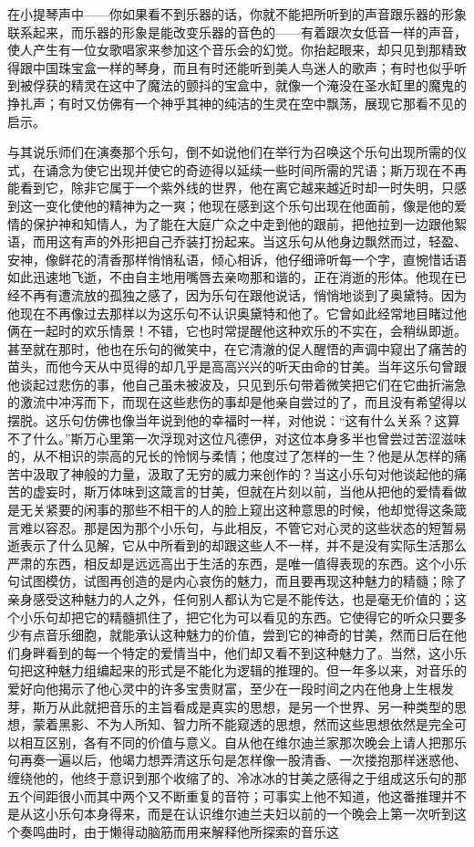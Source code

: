 \par 在小提琴声中——你如果看不到乐器的话，你就不能把所听到的声音跟乐器的形象联系起来，而乐器的形象是能改变乐器的音色的——有着跟次女低音一样的声音，使人产生有一位女歌唱家来参加这个音乐会的幻觉。你抬起眼来，却只见到那精致得跟中国珠宝盒一样的琴身，而且有时还能听到美人鸟迷人的歌声；有时也似乎听到被俘获的精灵在这中了魔法的颤抖的宝盒中，就像一个淹没在圣水缸里的魔鬼的挣扎声；有时又仿佛有一个神乎其神的纯洁的生灵在空中飘荡，展现它那看不见的启示。
\par 与其说乐师们在演奏那个乐句，倒不如说他们在举行为召唤这个乐句出现所需的仪式，在诵念为使它出现并使它的奇迹得以延续一些时间所需的咒语；斯万现在不再能看到它，除非它属于一个紫外线的世界，他在离它越来越近时却一时失明，只感到这一变化使他的精神为之一爽；他现在感到这个乐句出现在他面前，像是他的爱情的保护神和知情人，为了能在大庭广众之中走到他的跟前，把他拉到一边跟他絮语，而用这有声的外形把自己乔装打扮起来。当这乐句从他身边飘然而过，轻盈、安神，像鲜花的清香那样悄悄私语，倾心相诉，他仔细谛听每一个字，直惋惜话语如此迅速地飞逝，不由自主地用嘴唇去亲吻那和谐的，正在消逝的形体。他现在已经不再有遭流放的孤独之感了，因为乐句在跟他说话，悄悄地谈到了奥黛特。因为他现在不再像过去那样以为这乐句不认识奥黛特和他了。它曾如此经常地目睹过他俩在一起时的欢乐情景！不错，它也时常提醒他这种欢乐的不实在，会稍纵即逝。甚至就在那时，他也在乐句的微笑中，在它清澈的促人醒悟的声调中窥出了痛苦的苗头，而他今天从中觅得的却几乎是高高兴兴的听天由命的甘美。当年这乐句曾跟他谈起过悲伤的事，他自己虽未被波及，只见到乐句带着微笑把它们在它曲折湍急的激流中冲泻而下，而现在这些悲伤的事却是他亲自尝过的了，而且没有希望得以摆脱。这乐句仿佛也像当年说到他的幸福时一样，对他说：“这有什么关系？这算不了什么。”斯万心里第一次浮现对这位凡德伊，对这位本身多半也曾尝过苦涩滋味的，从不相识的崇高的兄长的怜悯与柔情；他度过了怎样的一生？他是从怎样的痛苦中汲取了神般的力量，汲取了无穷的威力来创作的？当这小乐句对他谈起他的痛苦的虚妄时，斯万体味到这箴言的甘美，但就在片刻以前，当他从把他的爱情看做是无关紧要的闲事的那些不相干的人的脸上窥出这种意思的时候，他却觉得这条箴言难以容忍。那是因为那个小乐句，与此相反，不管它对心灵的这些状态的短暂易逝表示了什么见解，它从中所看到的却跟这些人不一样，并不是没有实际生活那么严肃的东西，相反却是远远高出于生活的东西，是唯一值得表现的东西。这个小乐句试图模仿，试图再创造的是内心哀伤的魅力，而且要再现这种魅力的精髓；除了亲身感受这种魅力的人之外，任何别人都认为它是不能传达，也是毫无价值的；这个小乐句却把它的精髓抓住了，把它化为可以看见的东西。它使得它的听众只要多少有点音乐细胞，就能承认这种魅力的价值，尝到它的神奇的甘美，然而日后在他们身畔看到的每一个特定的爱情当中，他们却又看不到这种魅力了。当然，这小乐句把这种魅力组编起来的形式是不能化为逻辑的推理的。但一年多以来，对音乐的爱好向他揭示了他心灵中的许多宝贵财富，至少在一段时间之内在他身上生根发芽，斯万从此就把音乐的主旨看成是真实的思想，是另一个世界、另一种类型的思想，蒙着黑影、不为人所知、智力所不能窥透的思想，然而这些思想依然是完全可以相互区别，各有不同的价值与意义。自从他在维尔迪兰家那次晚会上请人把那乐句再奏一遍以后，他竭力想弄清这乐句是怎样像一股清香、一次搂抱那样迷惑他、缠绕他的，他终于意识到那个收缩了的、冷冰冰的甘美之感得之于组成这乐句的那五个间距很小而其中两个又不断重复的音符；可事实上他不知道，他这番推理并不是从这小乐句本身得来，而是在认识维尔迪兰夫妇以前的一个晚会上第一次听到这个奏鸣曲时，由于懒得动脑筋而用来解释他所探索的音乐这